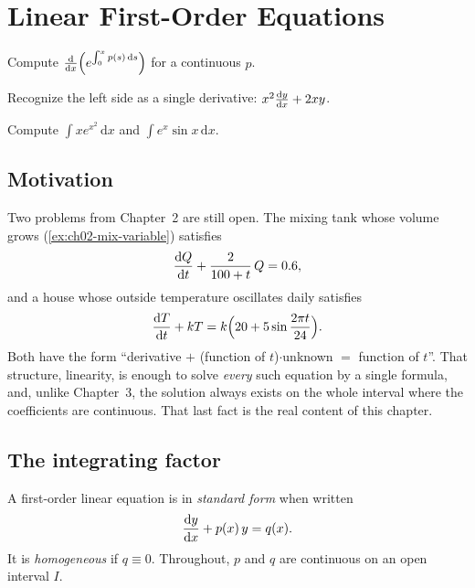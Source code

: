 \chapter{Linear First-Order Equations}\label{ch:ch04}

\begin{diagnostic}
  \item Compute $\frac{\mathrm{d}}{\mathrm{d}x}\Bigl(e^{\int_0^x p(s)\,\mathrm{d}s}\Bigr)$ for a
        continuous $p$.
  \item Recognize the left side as a single derivative:
        $x^2\frac{\mathrm{d}y}{\mathrm{d}x} + 2xy$.
  \item Compute $\displaystyle\int x e^{x^2}\,\mathrm{d}x$ and
        $\displaystyle\int e^{x}\sin x\,\mathrm{d}x$.
\end{diagnostic}

\section{Motivation}\label{sec:ch04-motivation}

Two problems from Chapter~2 are still open. The mixing tank whose volume grows
(\cref{ex:ch02-mix-variable}) satisfies
\[
  \frac{\mathrm{d}Q}{\mathrm{d}t} + \frac{2}{100 + t}\,Q = 0.6,
\]
and a house whose outside temperature oscillates daily satisfies
\[
  \frac{\mathrm{d}T}{\mathrm{d}t} + kT = k\Bigl(20 + 5\sin\frac{2\pi t}{24}\Bigr).
\]
Both have the form ``derivative $+$ (function of $t$)$\cdot$unknown $=$
function of $t$''. That structure, linearity, is enough to solve
\emph{every} such equation by a single formula, and, unlike Chapter~3, the
solution always exists on the whole interval where the coefficients are
continuous. That last fact is the real content of this chapter.

\section{The integrating factor}\label{sec:ch04-theory}

\begin{definition}\label{def:ch04-standard}
A first-order linear equation is in \emph{standard form} when written
\begin{equation}\label{eq:ch04-standard}
  \frac{\mathrm{d}y}{\mathrm{d}x} + p(x)\,y = q(x).
\end{equation}
It is \emph{homogeneous} if $q\equiv 0$. Throughout, $p$ and $q$ are continuous
on an open interval $I$.
\end{definition}

